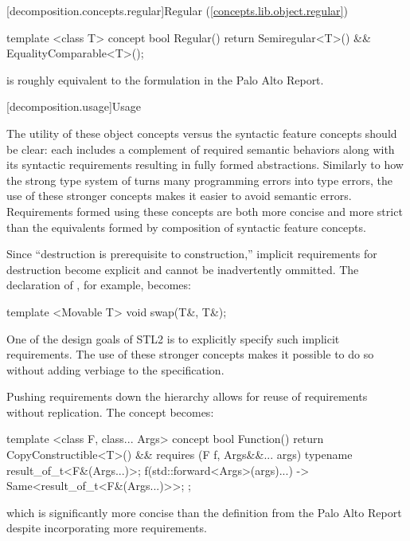 [decomposition.concepts.regular]{Regular (\ref{concepts.lib.object.regular})}
\begin{codeblock}
template <class T>
concept bool Regular() {
  return Semiregular<T>() &&
    EqualityComparable<T>();
}
\end{codeblock}
 is roughly equivalent to the formulation in the Palo Alto Report.

[decomposition.usage]{Usage}

\pnum
The utility of these object concepts versus the syntactic feature concepts should be clear: each
includes a complement of required semantic behaviors along with its syntactic requirements resulting
in fully formed abstractions. Similarly to how the strong type system of \Cpp turns many programming
errors into type errors, the use of these stronger concepts makes it easier to avoid semantic errors.
Requirements formed using these concepts are both more concise and more strict than the equivalents
formed by composition of syntactic feature concepts.

\pnum
Since ``destruction is prerequisite to construction,'' implicit requirements for destruction become
explicit and cannot be inadvertently ommitted. The declaration of , for example, becomes:
\begin{codeblock}
template <Movable T>
void swap(T&, T&);
\end{codeblock}
One of the design goals of STL2 is to explicitly specify such implicit requirements. The use of these
stronger concepts makes it possible to do so without adding verbiage to the specification.

\pnum
Pushing requirements down the hierarchy allows for reuse of requirements without replication. The
 concept becomes:
\begin{codeblock}
template <class F, class... Args>
concept bool Function() {
  return CopyConstructible<T>() &&
    requires (F f, Args&&... args) {
      typename result_of_t<F&(Args...)>;
      { f(std::forward<Args>(args)...) } ->
        Same<result_of_t<F&(Args...)>>;
    };
}
\end{codeblock}
which is significantly more concise than the definition from the Palo Alto Report despite
incorporating more requirements.

